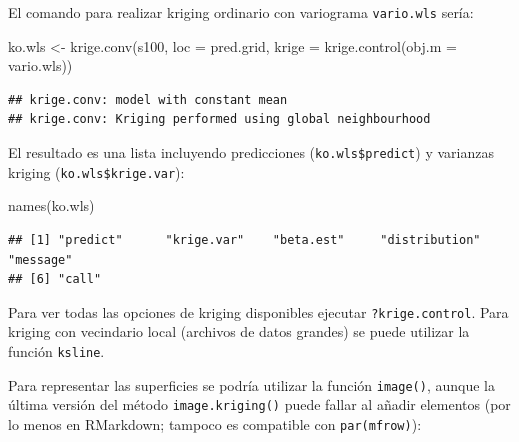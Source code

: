 \documentclass[
  spanish,
]{book}
\newenvironment{Shaded}{\begin{snugshade}}{\end{snugshade}}
\newcommand{\AttributeTok}[1]{\textcolor[rgb]{0.77,0.63,0.00}{#1}}
\newcommand{\CommentTok}[1]{\textcolor[rgb]{0.56,0.35,0.01}{\textit{#1}}}
\newcommand{\ConstantTok}[1]{\textcolor[rgb]{0.00,0.00,0.00}{#1}}
\newcommand{\FunctionTok}[1]{\textcolor[rgb]{0.00,0.00,0.00}{#1}}
\newcommand{\NormalTok}[1]{#1}
\newcommand{\OtherTok}[1]{\textcolor[rgb]{0.56,0.35,0.01}{#1}}
\newcommand{\SpecialCharTok}[1]{\textcolor[rgb]{0.00,0.00,0.00}{#1}}
\newcommand{\StringTok}[1]{\textcolor[rgb]{0.31,0.60,0.02}{#1}}
\theoremstyle{break}
\theoremstyle{definition}
\theoremstyle{definition}
\theoremstyle{definition}
\theoremstyle{definition}
\theoremstyle{remark}
\begin{document}
El comando para realizar kriging ordinario con variograma \texttt{vario.wls}
sería:

\begin{Shaded}
\begin{Highlighting}[]
\NormalTok{ko.wls }\OtherTok{\textless{}{-}} \FunctionTok{krige.conv}\NormalTok{(s100, }\AttributeTok{loc =}\NormalTok{ pred.grid, }\AttributeTok{krige =} \FunctionTok{krige.control}\NormalTok{(}\AttributeTok{obj.m =}\NormalTok{ vario.wls))}
\end{Highlighting}
\end{Shaded}

\begin{verbatim}
## krige.conv: model with constant mean
## krige.conv: Kriging performed using global neighbourhood
\end{verbatim}

El resultado es una lista incluyendo predicciones (\texttt{ko.wls\$predict}) y
varianzas kriging (\texttt{ko.wls\$krige.var}):

\begin{Shaded}
\begin{Highlighting}[]
\FunctionTok{names}\NormalTok{(ko.wls)}
\end{Highlighting}
\end{Shaded}

\begin{verbatim}
## [1] "predict"      "krige.var"    "beta.est"     "distribution" "message"     
## [6] "call"
\end{verbatim}

Para ver todas las opciones de kriging disponibles ejecutar
\texttt{?krige.control}. Para kriging con vecindario local (archivos de datos
grandes) se puede utilizar la función \texttt{ksline}.

Para representar las superficies se podría utilizar la función \texttt{image()},
aunque la última versión del método \texttt{image.kriging()} puede fallar al añadir
elementos (por lo menos en RMarkdown; tampoco es compatible con \texttt{par(mfrow)}):

\begin{Shaded}
\end{Shaded}
\end{document}
